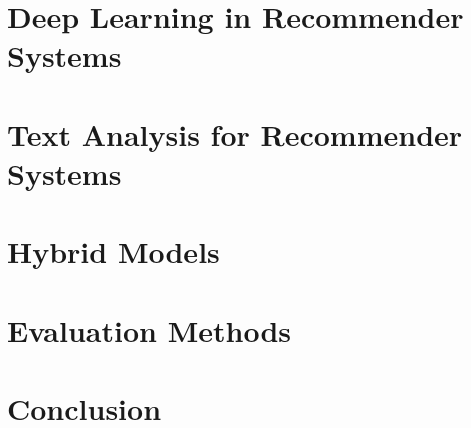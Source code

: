 \section{Deep Learning in Recommender Systems}
\label{chp2-sec4}



\section{Text Analysis for Recommender Systems}
\label{chp2-sec5}




\section{Hybrid Models}
\label{chp2-sec6}



\section{Evaluation Methods}
\label{chp2-sec7}



\section{Conclusion}
\label{chp2-sec8}

